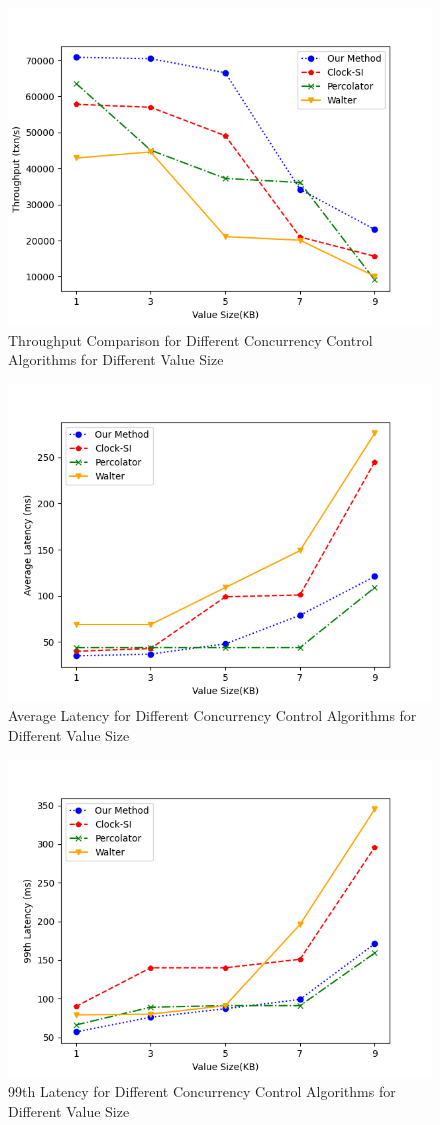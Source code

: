 \begin{figure}[H]
    \centering
    \includegraphics[width=0.8\linewidth]{figure/43.png}
    \caption{Throughput Comparison for Different Concurrency Control Algorithms for Different Value Size}
    \label{fig:43}
\end{figure}
\begin{figure}[H]
    \centering
    \includegraphics[width=0.8\linewidth]{figure/44.png}
    \caption{Average Latency for Different Concurrency Control Algorithms for Different Value Size}
    \label{fig:44}
\end{figure}
\begin{figure}[H]
    \centering
    \includegraphics[width=0.8\linewidth]{figure/45.png}
    \caption{99th Latency for Different Concurrency Control Algorithms for Different Value Size}
    \label{fig:45}
\end{figure}




